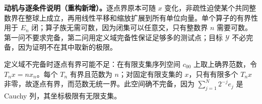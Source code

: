 \documentclass[../../main.tex]{subfiles}
\begin{document}
\begin{remark}
\textbf{动机与逐条件说明（重构新增）。}逐点界原本可随 $x$ 变化，非疏性迫使某个共同整数界在整球上成立，再用线性平移和缩放扩展到所有单位向量。单个算子的有界性用于 $E_n$ 闭；算子族无需可数，因为闭集可以任意交，只有整数界 $n$ 需要可数。第一问不要求完备，第二问用定义域完备性保证足够多的测试点；目标 $\mathcal Y$ 不必完备，因为证明不在其中取新的极限。

定义域不完备时逐点有界可能不足：在有限支集序列空间 $c_{00}$ 上取上确界范数，令 $T_nx=nx_n$。每个 $T_n$ 有界且范数为 $n$；对固定有限支集的 $x$，只有有限多个 $T_nx$ 非零，故逐点有界，而范数无统一界。此空间确不完备，因为 $\sum_{j=1}^N2^{-j}e_j$ 是 Cauchy 列，其坐标极限有无限支集。
\end{remark}

\end{document}
